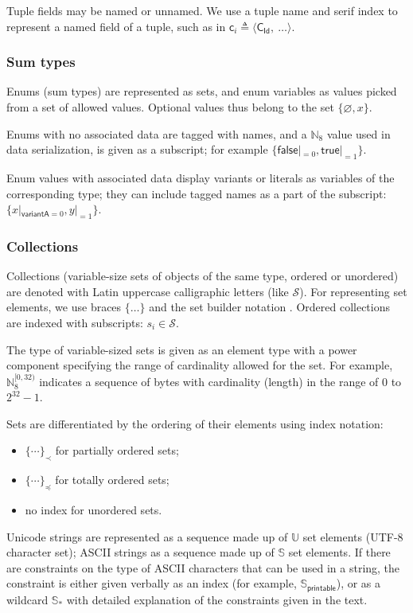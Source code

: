 \documentclass[9pt,oneside]{amsart}
\begin{document}
\begin{multicols}{2}
Tuple fields may be named or unnamed.
We use a tuple name and serif index to represent a named field of a tuple,
such as in $\mathsf{c}_i \triangleq \langle \mathsf{C_{Id}}, \ \ldots \rangle$.

\subsubsection{Sum types}

Enums (sum types) are represented as sets, and enum variables as values
picked from a set of allowed values.
Optional values thus belong to the set $\{ \varnothing, x \}$.

Enums with no associated data are tagged with names,
and a $\mathbb{N}_8$ value used in data serialization, is given as a subscript;
for example $\{ \mathsf{false}|_{=0}, \mathsf{true}|_{=1} \}$.

Enum values with associated data display variants or literals as variables of the corresponding type;
they can include tagged names as a part of the subscript: $\{ x|_{\mathsf{variantA}=0}, y|_{=1} \}$.

\subsubsection{Collections}

Collections (variable-size sets of objects of the same type, ordered or unordered)
are denoted with Latin uppercase calligraphic letters (like $\mathcal{S}$).
For representing set elements, we use braces $\{\ldots\}$ and the set builder notation \cite{setbuilder}.
Ordered collections are indexed with subscripts: $s_i \in \mathcal{S}$.

The type of variable-sized sets is given as an element type with a power component
specifying the range of cardinality allowed for the set.
For example, $\mathbb{N}_8^{[0, 32)}$ indicates a sequence of bytes with cardinality (length)
in the range of $0$ to $2^{32} - 1$.

Sets are differentiated by the ordering of their elements using index notation:
\begin{itemize}
    \item $\{ \cdots \}_\prec$ for partially ordered sets;
    \item $\{ \cdots \}_\preceq$ for totally ordered sets;
    \item no index for unordered sets.
\end{itemize}

Unicode strings are represented as a sequence made up of $\mathbb{U}$ set elements
(UTF-8 character set); ASCII strings as a sequence made up of $\mathbb{S}$ set elements.
If there are constraints on the type of ASCII characters that can be used in a string,
the constraint is either given verbally as an index (for example, $\mathbb{S}_\mathsf{printable}$),
or as a wildcard $\mathbb{S}_*$ with detailed explanation of the constraints given in the text.


\end{multicols}
\end{document}

